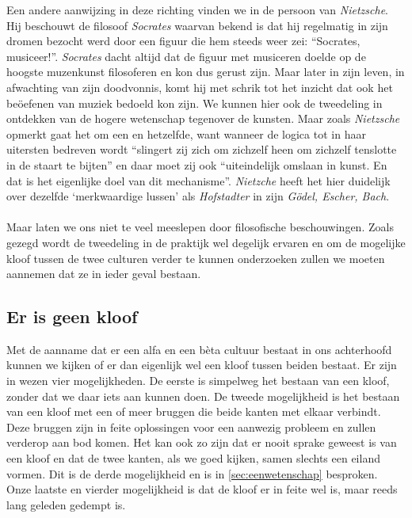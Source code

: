 Een andere aanwijzing in deze richting vinden we in de persoon van \emph{Nietzsche}. Hij beschouwt de filosoof \emph{Socrates} waarvan bekend is dat hij regelmatig in zijn dromen bezocht werd door een figuur die hem steeds weer zei: ``Socrates, musiceer!''. \emph{Socrates} dacht altijd dat de figuur met musiceren doelde op de hoogste muzenkunst filosoferen en kon dus gerust zijn. Maar later in zijn leven, in afwachting van zijn doodvonnis, komt hij met schrik tot het inzicht dat ook het be\"oefenen van muziek bedoeld kon zijn. We kunnen hier ook de tweedeling in ontdekken van de hogere wetenschap tegenover de kunsten. Maar zoals \emph{Nietzsche} opmerkt gaat het om een en hetzelfde, want wanneer de logica tot in haar uitersten bedreven wordt ``slingert zij zich om zichzelf heen om zichzelf tenslotte in de staart te bijten'' en daar moet zij ook ``uiteindelijk omslaan in kunst. En dat is het eigenlijke doel van dit mechanisme''. \emph{Nietzche} heeft het hier duidelijk over dezelfde `merkwaardige lussen' als \emph{Hofstadter} in zijn \emph{G\"odel, Escher, Bach}.

\paragraph{}

Maar laten we ons niet te veel meeslepen door filosofische beschouwingen. Zoals gezegd wordt de tweedeling in de praktijk wel degelijk ervaren en om de mogelijke kloof tussen de twee culturen verder te kunnen onderzoeken zullen we moeten aannemen dat ze in ieder geval bestaan.


\subsection{Er is geen kloof}\label{sec:geenkloof}

Met de aanname dat er een alfa en een b\`eta cultuur bestaat in ons achterhoofd kunnen we kijken of er dan eigenlijk wel een kloof tussen beiden bestaat. Er zijn in wezen vier mogelijkheden. De eerste is simpelweg het bestaan van een kloof, zonder dat we daar iets aan kunnen doen. De tweede mogelijkheid is het bestaan van een kloof met een of meer bruggen die beide kanten met elkaar verbindt. Deze bruggen zijn in feite oplossingen voor een aanwezig probleem en zullen verderop aan bod komen. Het kan ook zo zijn dat er nooit sprake geweest is van een kloof en dat de twee kanten, als we goed kijken, samen slechts een eiland vormen. Dit is de derde mogelijkheid en is in \ref{sec:eenwetenschap} besproken. Onze laatste en vierder mogelijkheid is dat de kloof er in feite wel is, maar reeds lang geleden gedempt is.

